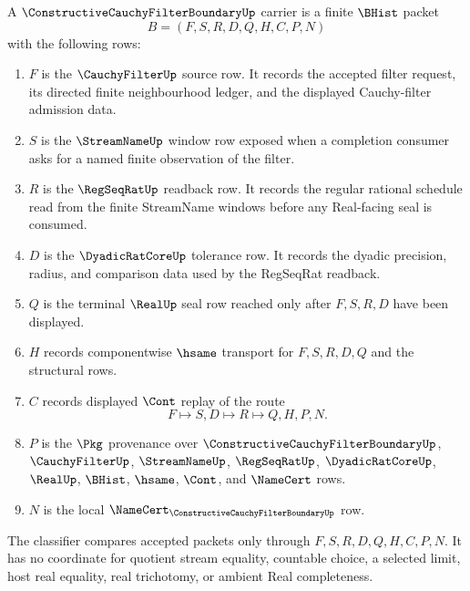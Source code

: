 \begin{definition}\label{def:constructive-cauchy-filter-boundary}
A $\ConstructiveCauchyFilterBoundaryUp$ carrier is a finite $\BHist$ packet
$$
B=(F,S,R,D,Q,H,C,P,N)
$$
with the following rows:
\begin{enumerate}
\item $F$ is the $\CauchyFilterUp$ source row. It records the accepted filter request, its directed finite neighbourhood ledger, and the displayed Cauchy-filter admission data.
\item $S$ is the $\StreamNameUp$ window row exposed when a completion consumer asks for a named finite observation of the filter.
\item $R$ is the $\RegSeqRatUp$ readback row. It records the regular rational schedule read from the finite StreamName windows before any Real-facing seal is consumed.
\item $D$ is the $\DyadicRatCoreUp$ tolerance row. It records the dyadic precision, radius, and comparison data used by the RegSeqRat readback.
\item $Q$ is the terminal $\RealUp$ seal row reached only after $F,S,R,D$ have been displayed.
\item $H$ records componentwise $\hsame$ transport for $F,S,R,D,Q$ and the structural rows.
\item $C$ records displayed $\Cont$ replay of the route
$$
F \longmapsto S,D \longmapsto R \longmapsto Q,H,P,N .
$$
\item $P$ is the $\Pkg$ provenance over $\ConstructiveCauchyFilterBoundaryUp$, $\CauchyFilterUp$, $\StreamNameUp$, $\RegSeqRatUp$, $\DyadicRatCoreUp$, $\RealUp$, $\BHist$, $\hsame$, $\Cont$, and $\NameCert$ rows.
\item $N$ is the local $\NameCert_{\ConstructiveCauchyFilterBoundaryUp}$ row.
\end{enumerate}
The classifier compares accepted packets only through $F,S,R,D,Q,H,C,P,N$. It has no coordinate for quotient stream equality, countable choice, a selected limit, host real equality, real trichotomy, or ambient Real completeness.
\end{definition}

